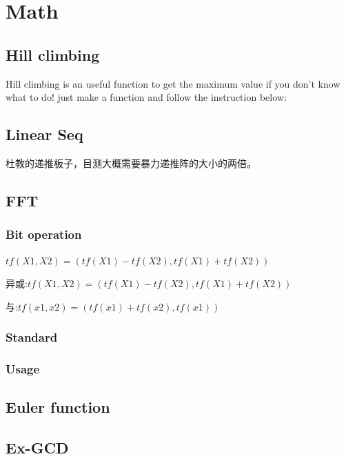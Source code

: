 \section{Math}
\subsection{Hill climbing}
Hill climbing is an useful function to get the maximum value if you don't know what to do!
just make a function and follow the instruction below:


\subsection{Linear Seq}
杜教的递推板子，目测大概需要暴力递推阵的大小的两倍。


\subsection{FFT}
\subsubsection{Bit operation}
$tf(X1,X2) = (tf(X1) - tf(X2), tf(X1) + tf(X2))$

异或:$tf(X1,X2) = (tf(X1) - tf(X2), tf(X1) + tf(X2))$ 

与:$tf(x1,x2)=(tf(x1) + tf(x2), tf(x1))$

\subsubsection{Standard}

\subsubsection{Usage}


\subsection{Euler function}


\subsection{Ex-GCD}

